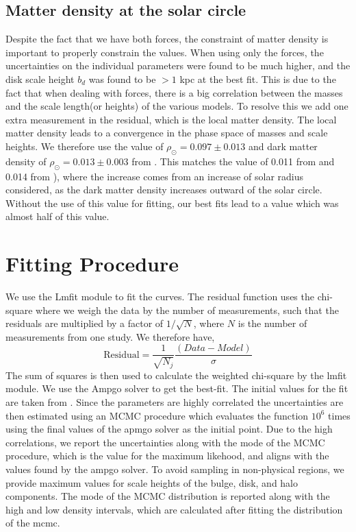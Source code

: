\documentclass[fleqn,usenatbib]{mnras}
\begin{document}
\subsection{Matter density at the solar circle}
Despite the fact that we have both forces, the constraint of matter density is important to properly constrain the values. When using only the forces, the uncertainties on the individual parameters were found to be much higher, and the disk scale height $b_d$ was found to be $>1$ kpc at the best fit. This is due to the fact that when dealing with forces, there is a big correlation between the masses and the scale length(or heights) of the various models. To resolve this we add one extra measurement in the residual, which is the local matter density. The local matter density leads to a convergence in the phase space of masses and scale heights. We therefore use the value of $\rho_\odot = 0.097 \pm 0.013$ and dark matter density of $\rho_\odot = 0.013 \pm 0.003$ from \citet{2015ApJ...814...13M}. This matches the value of 0.011 from \citet{2010A&A...523A..83S} and 0.014 from \citet{2014A&A...571A..92B}), where the increase comes from an increase of solar radius considered, as the dark matter density increases outward of the solar circle. Without the use of this value for fitting, our best fits lead to a value which was almost half of this value.
\section{Fitting Procedure}

We use the Lmfit module \citep{newville_matthew_2014_11813} to fit the curves. The residual function uses the chi-square where we weigh the data by the number of measurements, such that the residuals are multiplied by a factor of $1/\sqrt{N}$, where $N$ is the number of measurements from one study. We therefore have,
\begin{equation}
    \text{Residual}= \frac{1}{\sqrt{N_j}}\frac{(Data-Model)}{\sigma}
\end{equation}
The sum of squares is then used to calculate the weighted chi-square by the lmfit module.
We use the Ampgo solver to get the best-fit. The initial values for the fit are taken from \citet{andreassmass}. Since the parameters are highly correlated the uncertainties are then estimated using an MCMC procedure which evaluates the function $10^6$ times using the final values of the apmgo solver as the initial point. Due to the high correlations, we report the uncertainties along with the mode of the MCMC procedure, which is the value for the maximum likehood, and aligns with the values found by the ampgo solver. To avoid sampling in non-physical regions, we provide maximum values for scale heights of the bulge, disk, and halo components. The mode of the MCMC distribution is reported along with the high and low density intervals, which are calculated after fitting the distribution of the mcmc.
\end{document}
